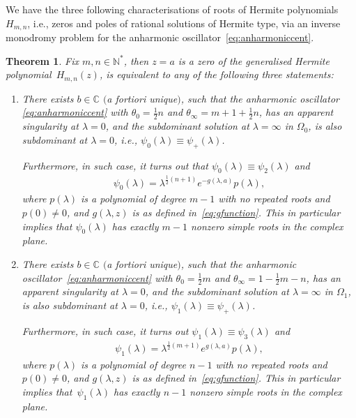 \documentclass[pdftex]{sigma}
\numberwithin{equation}{section}
\newtheorem{thm}{Theorem}[section]
\newcommand{\la}{\lambda}
\begin{document}
We have the three following characterisations of roots of Hermite polynomials~$H_{m,n}$, i.e., zeros and poles of rational solutions of Hermite type, via
an inverse monodromy problem for the anharmonic oscillator~\eqref{eq:anharmoniccent}.
\begin{thm}\label{thm:hermiteanharmonic}
Fix $m,n\in\mathbb{N}^*$, then $z=a$ is a zero of the generalised Hermite polyno\-mial~$H_{m,n}(z)$, is equivalent to any of the following three statements:
	\begin{enumerate}[label={{\rm H.\arabic*:}},ref={\rm H.\arabic*}] \itemsep=0pt
\item There exists $b\in\mathbb{C}$ $($a fortiori unique$)$, such that the anharmonic oscillator \eqref{eq:anharmoniccent} with
		$\theta_0=\tfrac{1}{2}n$ and $\theta_\infty=m+1+\tfrac{1}{2}n$, has an apparent singularity at $\lambda=0$,
		and the subdominant solution at $\lambda=\infty$ in $\Omega_0$, is also subdominant at $\lambda=0$, i.e.,
		$\psi_0(\lambda)\equiv \psi_{+}(\lambda)$.
		
		Furthermore, in such case, it turns out that $\psi_0(\lambda)\equiv \psi_2(\lambda)$ and
		\begin{gather*}
		\psi_0(\lambda)=\lambda^{\frac{1}{2}(n+1)}e^{-g(\lambda,a)}p(\lambda),
		\end{gather*}
		where $p(\lambda)$ is a polynomial of degree $m-1$ with no repeated roots and $p(0)\neq 0$,
		and $g(\la,z)$ is as def\/ined in~\eqref{eq:gfunction}. This in particular implies that
		$\psi_0(\lambda)$ has exactly $m-1$ nonzero simple roots in the complex plane.	\label{H1}

\item There exists $b\in\mathbb{C}$ $($a fortiori unique$)$, such that the anharmonic oscillator~\eqref{eq:anharmoniccent}
		with $\theta_0=\tfrac{1}{2}m$ and $\theta_\infty=1-\tfrac{1}{2}m-n$, has an apparent singularity at $\lambda=0$, and
		the subdominant solution at $\lambda=\infty$ in $\Omega_1$, is also subdominant at $\lambda=0$, i.e.,
		$\psi_1(\lambda)\equiv \psi_{+}(\lambda)$.
		
		Furthermore, in such case, it turns out $\psi_1(\lambda)\equiv \psi_3(\lambda)$ and
		\begin{gather*}
		\psi_1(\lambda)=\lambda^{\frac{1}{2}(m+1)}e^{g(\lambda,a)}p(\lambda),
		\end{gather*}
		where $p(\lambda)$ is a polynomial of degree $n-1$ with no repeated roots and $p(0)\neq 0$,
		and $g(\la,z)$ is as def\/ined in~\eqref{eq:gfunction}. This in particular implies that~$\psi_1(\lambda)$ has exactly $n-1$ nonzero simple roots in the complex plane.\label{H2}


\end{enumerate}
\end{thm}
\end{document}

